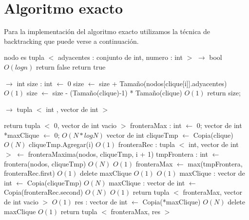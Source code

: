 \documentclass[a4paper, 10pt, twoside]{article}
\newenvironment{pseudo}[1][]{%
    \vspace{1em}%
    \begin{algorithmic}%
}
{%
    \end{algorithmic}%
    \vspace{1em}%
}
\newcommand{\Ode}[1]{\hfill $O(#1)$}
\begin{document}


\newpage

\section{Algoritmo exacto}

Para la implementación del algoritmo exacto utilizamos la técnica de backtracking que puede verse a continuación.

\begin{pseudo}

\State nodo es tupla $<$ adyacentes : conjunto de int, numero : int $>$
\State
{} $\rightarrow$ bool
										\Ode{log n}
			\State return false
		\EndIf
	\EndFor
	\State return true
\EndProcedure

\State
{} $\rightarrow$ int 
	\State size : int $\leftarrow$ 0
		\State size $\leftarrow$ size + Tamaño(nodos[clique[i]].adyacentes)				\Ode{1}
	\EndFor
	\State size $\leftarrow$ size - (Tamaño(clique)-1) * Tamaño(clique)				\Ode{1}
	\State return size;
\EndProcedure

\State
{} $\rightarrow$ tupla $<$ int , vector de int $>$

	 return tupla $<$ 0, vector de int vacio $>$ \EndIf
	\State fronteraMax : int $\leftarrow$ 0; 
	\State vector de int *maxClique $\leftarrow$ 0; 
																	\Ode{N*log N}
			\State vector de int cliqueTmp $\leftarrow$ Copia(clique)						\Ode{N}
			\State cliqueTmp.Agregar(i)																			\Ode{1}
			\State fronteraRec : tupla $<$ int, vector de int $>$ $\leftarrow$ fronteraMaxima(nodos, cliqueTmp, i + 1)
			\State tmpFrontera : int $\leftarrow$ frontera(nodos, cliqueTmp)		\Ode{N}
									\Ode{1}
				\State fronteraMax $\leftarrow$ max(tmpFrontera, fronteraRec.first)	\Ode{1}
				 delete maxClique \EndIf												\Ode{1}
																			\Ode{1}
					\State maxClique : vector de int $\leftarrow$ Copia(cliqueTmp)		\Ode{N}
				\Else
					\State maxClique : vector de int $\leftarrow$ Copia(fronteraRec.second) \Ode{N}
				\EndIf
			\EndIf
		\EndIf
	\EndFor
																									\Ode{1}
		\State return tupla $<$ fronteraMax, vector de int vacio $>$					\Ode{1}
	\Else
		 \State res : vector de int $\leftarrow$ Copia(*maxClique)						\Ode{N}
		\State delete maxClique																					\Ode{1}
		\State return tupla $<$ fronteraMax, res $>$
	\EndIf


\end{pseudo}
\end{document}
